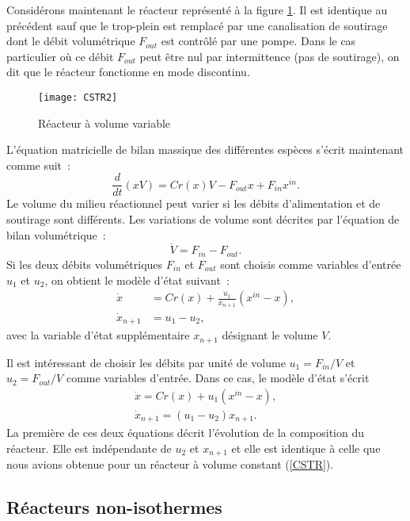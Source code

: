 Considérons maintenant le réacteur représenté à la figure \ref{Fig:CSTR2}. Il est
identique au précédent sauf que le trop-plein est remplacé par une canalisation
de soutirage dont le débit volumétrique $F_{out}$ est contrôlé par
une pompe. Dans le cas particulier où ce débit $F_{out}$ peut être nul par
intermittence (pas de soutirage), on dit que le réacteur fonctionne en mode
discontinu.
\begin{figure}[htbp] 
   \centering
   \texttt{[image: CSTR2]} 
   \caption{Réacteur à volume variable}
   \label{Fig:CSTR2}
\end{figure}
L'équation matricielle de bilan massique des différentes espèces s'écrit
maintenant comme suit~:
$$
\frac{d}{dt} (xV) = Cr(x)V - F_{out}x + F_{in}x^{in}.
$$
Le volume du milieu réactionnel peut varier si les débits d'alimentation et de
soutirage sont différents. Les variations de volume sont décrites par l'équation de
bilan volumétrique~:
$$
\dot V = F_{in} -F_{out}.
$$
Si les deux débits volumétriques $F_{in}$ et $F_{out}$ sont
choisis comme variables d'entrée $u_1$ et $u_2$, on obtient le modèle d'état
suivant~: 
\begin{equation*} \begin{split}
\dot x &= Cr(x) + \frac{u_1}{x_{n+1}} (x^{in} - x), \\
\dot x_{n+1} &= u_1 - u_2,
\end{split} \end{equation*}
avec la variable d'état supplémentaire $x_{n+1}$ désignant le volume $V$.

Il est intéressant de choisir les débits par unité de volume $u_1 =
F_{in}/V$ et $u_2 = F_{out}/V$ comme variables d'entrée. Dans ce cas, le modèle
d'état s'écrit
\begin{equation*} \begin{split}
\dot x = Cr(x) + u_1(x^{in} - x), \\
\dot x_{n+1}= (u_1 - u_2)x_{n+1}.
\end{split} \end{equation*}
La première de ces deux équations décrit l'évolution de la
composition du réacteur. Elle est indépendante de $u_2$ et $x_{n+1}$ et elle est
identique à celle que nous avions obtenue pour un réacteur à volume constant
(\ref{CSTR}). 

\subsection{Réacteurs non-isothermes}

